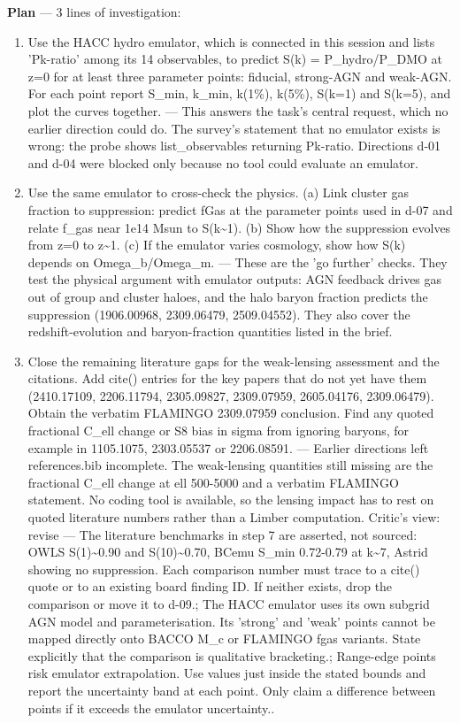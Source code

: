 \documentclass[11pt,a4paper]{article}
\begin{document}
\textbf{Plan} --- 3 lines of investigation:

\begin{enumerate}
  \item Use the HACC hydro emulator, which is connected in this session and lists 'Pk-ratio' among its 14 observables, to predict S(k) = P\_hydro/P\_DMO at z=0 for at least three parameter points: fiducial, strong-AGN and weak-AGN. For each point report S\_min, k\_min, k(1\%), k(5\%), S(k=1) and S(k=5), and plot the curves together. --- This answers the task's central request, which no earlier direction could do. The survey's statement that no emulator exists is wrong: the probe shows list\_observables returning Pk-ratio. Directions d-01 and d-04 were blocked only because no tool could evaluate an emulator.
  \item Use the same emulator to cross-check the physics. (a) Link cluster gas fraction to suppression: predict fGas at the parameter points used in d-07 and relate f\_gas near 1e14 Msun to S(k\textasciitilde{}1). (b) Show how the suppression evolves from z=0 to z\textasciitilde{}1. (c) If the emulator varies cosmology, show how S(k) depends on Omega\_b/Omega\_m. --- These are the 'go further' checks. They test the physical argument with emulator outputs: AGN feedback drives gas out of group and cluster haloes, and the halo baryon fraction predicts the suppression (1906.00968, 2309.06479, 2509.04552). They also cover the redshift-evolution and baryon-fraction quantities listed in the brief.
  \item Close the remaining literature gaps for the weak-lensing assessment and the citations. Add cite() entries for the key papers that do not yet have them (2410.17109, 2206.11794, 2305.09827, 2309.07959, 2605.04176, 2309.06479). Obtain the verbatim FLAMINGO 2309.07959 conclusion. Find any quoted fractional C\_ell change or S8 bias in sigma from ignoring baryons, for example in 1105.1075, 2303.05537 or 2206.08591. --- Earlier directions left references.bib incomplete. The weak-lensing quantities still missing are the fractional C\_ell change at ell 500-5000 and a verbatim FLAMINGO statement. No coding tool is available, so the lensing impact has to rest on quoted literature numbers rather than a Limber computation.
Critic's view: revise --- The literature benchmarks in step 7 are asserted, not sourced: OWLS S(1)\textasciitilde{}0.90 and S(10)\textasciitilde{}0.70, BCemu S\_min 0.72-0.79 at k\textasciitilde{}7, Astrid showing no suppression. Each comparison number must trace to a cite() quote or to an existing board finding ID. If neither exists, drop the comparison or move it to d-09.; The HACC emulator uses its own subgrid AGN model and parameterisation. Its 'strong' and 'weak' points cannot be mapped directly onto BACCO M\_c or FLAMINGO fgas variants. State explicitly that the comparison is qualitative bracketing.; Range-edge points risk emulator extrapolation. Use values just inside the stated bounds and report the uncertainty band at each point. Only claim a difference between points if it exceeds the emulator uncertainty..

\end{enumerate}
\end{document}
